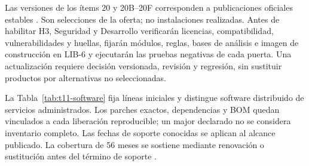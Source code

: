 Las versiones de los ítems 20 y 20B--20F corresponden a publicaciones oficiales estables \parencites{lote01-opentofu,lote01-semgrep,lote01-trivy,lote01-gitleaks,lote01-zap,lote01-cosign}. Son selecciones de la oferta; no instalaciones realizadas. Antes de habilitar H3, Seguridad y Desarrollo verificarán licencias, compatibilidad, vulnerabilidades y huellas, fijarán módulos, reglas, bases de análisis e imagen de construcción en LIB-6 y ejecutarán las pruebas negativas de cada puerta. Una actualización requiere decisión versionada, revisión y regresión, sin sustituir productos por alternativas no seleccionadas.

La Tabla~\ref{tab:t11-software} fija líneas iniciales y distingue software distribuido de servicios administrados. Los parches exactos, dependencias y BOM quedan vinculados a cada liberación reproducible; un major declarado no se considera inventario completo. Las fechas de soporte conocidas se aplican al alcance publicado. La cobertura de 56 meses se sostiene mediante renovación o sustitución antes del término de soporte \parencite[secc.~1.6, p.~5; secc.~8.4, pp.~19--20]{pucv-transversal}.

